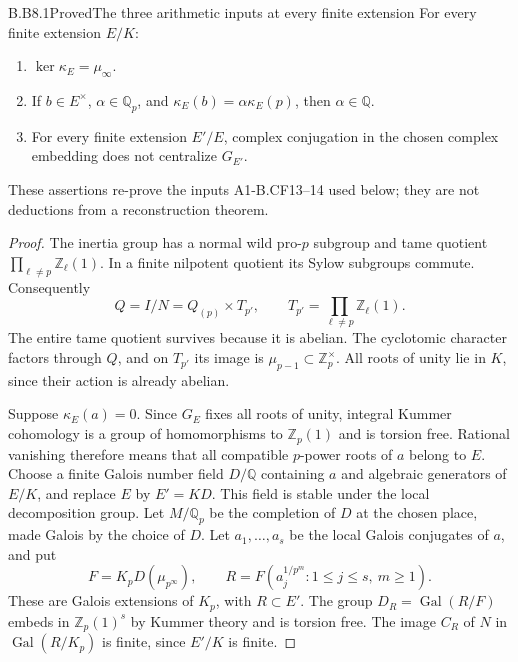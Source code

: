 \begin{claim}{B.B8.1}{Proved}{The three arithmetic inputs at every finite extension}
For every finite extension $E/K$:
\begin{enumerate}
\item $\ker\kappa_E=\mu_\infty$.
\item If $b\in E^\times$, $\alpha\in\mathbb Q_p$, and
      $\kappa_E(b)=\alpha\kappa_E(p)$, then $\alpha\in\mathbb Q$.
\item For every finite extension $E'/E$, complex conjugation in the
      chosen complex embedding does not centralize $G_{E'}$.
\end{enumerate}
These assertions re-prove the inputs A1-B.CF13--14 used below; they
are not deductions from a reconstruction theorem.
\end{claim}
\begin{proof}
The inertia group has a normal wild pro-$p$ subgroup and tame quotient
$\prod_{\ell\ne p}\mathbb Z_\ell(1)$.  In a finite nilpotent
quotient its Sylow subgroups commute.  Consequently
\[
 Q=I/N=Q_{(p)}\times T_{p'},\qquad
 T_{p'}=\prod_{\ell\ne p}\mathbb Z_\ell(1).
\]
The entire tame quotient survives because it is abelian.  The
cyclotomic character factors through $Q$, and on $T_{p'}$ its image
is $\mu_{p-1}\subset\mathbb Z_p^\times$.  All roots of unity lie
in $K$, since their action is already abelian.

Suppose $\kappa_E(a)=0$.  Since $G_E$ fixes all roots of unity,
integral Kummer cohomology is a group of homomorphisms to
$\mathbb Z_p(1)$ and is torsion free.  Rational vanishing therefore
means that all compatible $p$-power roots of $a$ belong to $E$.
Choose a finite Galois number field $D/\mathbb Q$ containing $a$
and algebraic generators of $E/K$, and replace $E$ by $E'=KD$.
This field is stable under the local decomposition group.  Let
$M/\mathbb Q_p$ be the completion of $D$ at the chosen place, made
Galois by the choice of $D$.  Let $a_1,\ldots,a_s$ be the local
Galois conjugates of $a$, and put
\[
 F=K_pD(\mu_{p^\infty}),\qquad
 R=F(a_j^{1/p^m}:1\leq j\leq s,\ m\geq1).
\]
These are Galois extensions of $K_p$, with $R\subset E'$.
The group $D_R=\operatorname{Gal}(R/F)$ embeds in
$\mathbb Z_p(1)^s$ by Kummer theory and is torsion free.  The image
$C_R$ of $N$ in $\operatorname{Gal}(R/K_p)$ is finite, since
$E'/K$ is finite.


\end{proof}
